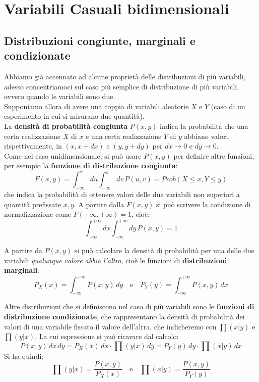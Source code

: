 \documentclass[openany,a4paper,12pt]{book}
\theoremstyle{remark}
\begin{document}
\section{Variabili Casuali bidimensionali}



\subsection{Distribuzioni congiunte, marginali e condizionate}


Abbiamo già accennato ad alcune proprietà delle distribuzioni di più variabili, adesso concentriamoci sul caso più semplice di distribuzione di più variabili, ovvero quando le variabili sono due.\\
Supponiamo allora di avere una coppia di variabili aleatorie $X$ e $Y$ (caso di un esperimento in cui si misurano due quantità).
\\
La \textbf{densità di probabilità congiunta} $P(x,y)$ indica la probabilità che una certa realizzazione $X$ di $x$ e una certa realizzazione $Y$ di $y$ abbiano valori, rispettivamente, in $(x, x+dx)$ e $(y, y+dy)$ per $dx \to 0$ e $dy \to 0$.
\\
Come nel caso unidimensionale, si può usare $P(x,y)$ per definire altre funzioni, per esempio la \textbf{funzione di distribuzione congiunta}:
\begin{equation}
    F(x,y) = \int_{-\infty}^{x} du \int_{-\infty}^{y} dv \, P(u,v) = Prob(X \le x, Y \le y)
\end{equation}
che indica la probabilità di ottenere valori delle due variabili non superiori a quantità prefissate $x, y$. A partire dalla $F(x,y)$ si può scrivere la condizione di normalizzazione come $F(+\infty, +\infty) = 1$, cioè:
\begin{equation}
    \int_{-\infty}^{+\infty} dx \int_{-\infty}^{+\infty} dy \, P(x,y) = 1
\end{equation}


A partire da $P(x,y)$ si può calcolare la densità di probabilità per una delle due variabili \textit{qualunque valore abbia l'altra}, cioè le funzioni di \textbf{distribuzioni marginali}:
\begin{equation}
    P_X(x) = \int_{-\infty}^{+\infty} P(x,y) \,dy \quad \text{e} \quad P_Y(y) = \int_{-\infty}^{+\infty} P(x,y) \,dx
\end{equation}

Altre distribuzioni che si definiscono nel caso di più variabili sono le \textbf{funzioni di distribuzione condizionate}, che rappresentano la densità di probabilità dei valori di una variabile fissato il valore dell'altra, che indicheremo con $\prod(x|y)$ e $\prod(y|x)$. La cui espressione si può ricavare dal calcolo:
\begin{equation}
    P(x,y)\,dx\,dy = P_X(x)\,dx \cdot \prod(y|x)\,dy = P_Y(y)\,dy \cdot \prod(x|y)\,dx
\end{equation}
Si ha quindi:
\begin{equation}
    \prod(y|x) = \frac{P(x,y)}{P_X(x)} \quad \text{e} \quad \prod(x|y) = \frac{P(x,y)}{P_Y(y)}
\end{equation}
\end{document}
